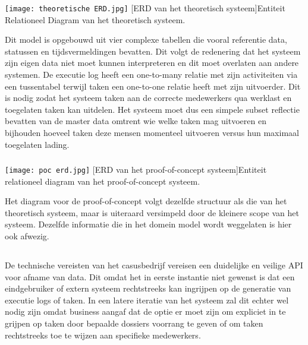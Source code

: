 \subsubsection{}%
\label{subsubsec:erd theoretisch systeem}
\begin{center}
  \captionsetup{type=figure}
  \texttt{[image: theoretische ERD.jpg]}
  [ERD van het theoretisch systeem]{Entiteit Relationeel Diagram van het theoretisch systeem.}
\end{center}
Dit model is opgebouwd uit vier complexe tabellen die vooral referentie data, statussen en tijdsvermeldingen bevatten. Dit volgt de redenering dat het systeem zijn eigen data niet moet kunnen interpreteren en dit moet overlaten aan andere systemen. De executie log heeft een one-to-many relatie met zijn activiteiten via een tussentabel terwijl taken een one-to-one relatie heeft met zijn uitvoerder. Dit is nodig zodat het systeem taken aan de correcte medewerkers qua werklast en toegelaten taken kan uitdelen. Het systeem moet dus een simpele subset reflectie bevatten van de master data omtrent wie welke taken mag uitvoeren en bijhouden hoeveel taken deze mensen momenteel uitvoeren versus hun maximaal toegelaten lading.

\subsubsection{}%
\label{subsubsec:erd proof-of-concept systeem}
\begin{center}
  \captionsetup{type=figure}
  \texttt{[image: poc erd.jpg]}
  [ERD van het proof-of-concept systeem]{Entiteit relationeel diagram van het proof-of-concept systeem.}
\end{center}
Het diagram voor de proof-of-concept volgt dezelfde structuur als die van het theoretisch systeem, maar is uiteraard versimpeld door de kleinere scope van het systeem. Dezelfde informatie die in het domein model wordt weggelaten is hier ook afwezig.

\subsection{}%
\label{subsec:rest-api}
De technische vereisten van het casusbedrijf vereisen een duidelijke en veilige API voor afname van data. Dit omdat het in eerste instantie niet gewenst is dat een eindgebruiker of extern systeem rechtstreeks kan ingrijpen op de generatie van executie logs of taken. In een latere iteratie van het systeem zal dit echter wel nodig zijn omdat business aangaf dat de optie er moet zijn om expliciet in te grijpen op taken door bepaalde dossiers voorrang te geven of om taken rechtstreeks toe te wijzen aan specifieke medewerkers. 

